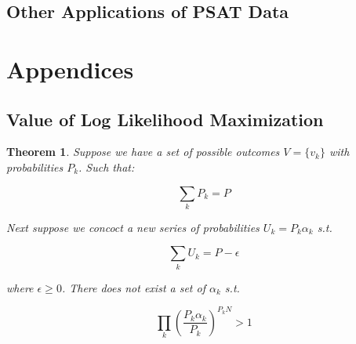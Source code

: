 \documentclass[11pt]{article}
\newtheorem{theorem}{Theorem}
\begin{document}
\subsection{Other Applications of PSAT Data}


















\newpage

















































\section{Appendices}


\subsection{Value of Log Likelihood Maximization}

\begin{theorem}
Suppose we have a set of possible outcomes $V=\lbrace v_k \rbrace$ with probabilities $P_k$. Such that:

$$\sum_k P_k = P$$

Next suppose we concoct a new series of probabilities $U_k = P_k \alpha_k$ s.t. 

$$\sum_k U_k = P-\epsilon$$

where $\epsilon \geq 0$. There does not exist a set of $\alpha_k$ s.t.

$$\prod_k \left(\frac{P_k\alpha_k}{P_k}\right)^{P_kN}>1$$

\end{theorem}
\end{document}
